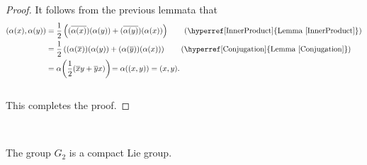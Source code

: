 \noindent\begin{proof} It follows from the previous lemmata that\\[-1.1\linespacing]
\begin{align*}
(\alpha(x), \alpha(y)) &= \frac{1}{2}\left((\overline{\alpha(x)})(\alpha(y)) + (\overline{\alpha(y)})(\alpha(x))\right)\tag*{(\hyperref[InnerProduct]{Lemma \ref*{InnerProduct}})}\\
&= \frac{1}{2}\left((\alpha(\overline{x}))(\alpha(y)) + (\alpha(\overline{y}))(\alpha(x))\right)\tag*{(\hyperref[Conjugation]{Lemma \ref*{Conjugation}})}\\
&= \alpha\!\left(\frac{1}{2}(\overline{x}y + \overline{y}x)\right)\! = \alpha((x, y)) = (x, y).
\end{align*}
\noindent\\[-0.5\linespacing] This completes the proof.
\end{proof}\\

\noindent\begin{theorem} The group $G_2$ is a compact Lie group.\\
\end{theorem}

